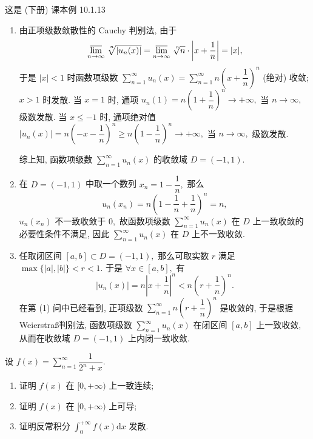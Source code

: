 \begin{solution}
  这是 (下册) 课本例 10.1.13

  \begin{enumerate}
    \item 由正项级数敛散性的 Cauchy 判别法, 由于
    $$\varlimsup_{n\to\infty} \nroot[n]{\lvert u_n(x) \rvert} = \varlimsup_{n\to\infty} \nroot[n]{n} \cdot \left\lvert x + \dfrac{1}{n} \right\rvert = \lvert x \rvert,$$
    于是 $\lvert x \rvert < 1$ 时函数项级数 $\sum\limits_{n=1}^{\infty} u_n(x) = \sum\limits_{n=1}^{\infty} n \left( x + \dfrac{1}{n} \right)^n$ (绝对) 收敛; $x > 1$ 时发散. 当 $x = 1$ 时, 通项 $u_n(1) = n \left( 1 + \dfrac{1}{n} \right)^n \to +\infty,$ 当 $n \to \infty,$ 级数发散. 当 $x \leqslant -1$ 时, 通项绝对值 $\lvert u_n(x) \rvert = n \left( -x - \dfrac{1}{n} \right)^n \geqslant n \left( 1 - \dfrac{1}{n} \right)^n \to +\infty,$ 当 $n \to \infty,$ 级数发散.

    综上知, 函数项级数 $\sum\limits_{n=1}^{\infty} u_n(x)$ 的收敛域 $D = (-1, 1).$
    \item 在 $D = (-1, 1)$ 中取一个数列 $x_n = 1 - \dfrac{1}{n},$ 那么
    $$u_n(x_n) = n \left( 1 - \dfrac{1}{n} + \dfrac{1}{n} \right)^n = n,$$
    $u_n(x_n)$ 不一致收敛于 $0,$ 故函数项级数 $\sum\limits_{n=1}^{\infty} u_n(x)$ 在 $D$ 上一致收敛的必要性条件不满足, 因此 $\sum\limits_{n=1}^{\infty} u_n(x)$ 在 $D$ 上不一致收敛.
    \item 任取闭区间 $[a, b] \subset D = (-1, 1),$ 那么可取实数 $r$ 满足 $\max\{\lvert a \rvert, \lvert b \rvert\} < r < 1.$ 于是 $\forall x \in [a, b],$ 有
    $$\lvert u_n(x) \rvert = n \left\lvert x + \dfrac{1}{n} \right\rvert^n < n \left( r + \dfrac{1}{n} \right)^n.$$
    在第 (1) 问中已经看到, 正项级数 $\sum\limits_{n=1}^{\infty} n \left( r + \dfrac{1}{n} \right)^n$ 是收敛的, 于是根据 Weierstra\ss 判别法, 函数项级数 $\sum\limits_{n=1}^{\infty} u_n(x)$ 在闭区间 $[a, b]$ 上一致收敛, 从而在收敛域 $D = (-1, 1)$ 上内闭一致收敛.
  \end{enumerate}
\end{solution}

\begin{question}[points = 10]
  设 $f(x) = \sum\limits_{n=1}^\infty \dfrac{1}{2^n + x}.$
  \begin{enumerate}
    \item 证明 $f(x)$ 在 $[0, +\infty)$ 上一致连续;
    \item 证明 $f(x)$ 在 $[0, +\infty)$ 上可导;
    \item 证明反常积分 $\int_0^{+\infty} f(x) \mathrm{d} x$ 发散.
  \end{enumerate}

\end{question}

